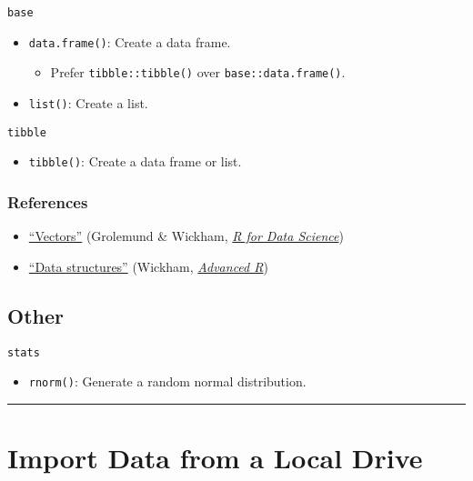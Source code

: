 \documentclass[]{book}
\providecommand{\tightlist}{%
  \setlength{\itemsep}{0pt}\setlength{\parskip}{0pt}}
\theoremstyle{definition}
\theoremstyle{definition}
\theoremstyle{definition}
\theoremstyle{remark}
\begin{document}
\texttt{base}

\begin{itemize}
\tightlist
\item
  \texttt{data.frame()}: Create a data frame.

  \begin{itemize}
  \tightlist
  \item
    Prefer \texttt{tibble::tibble()} over \texttt{base::data.frame()}.
  \end{itemize}
\item
  \texttt{list()}: Create a list.
\end{itemize}

\texttt{tibble}

\begin{itemize}
\tightlist
\item
  \texttt{tibble()}: Create a data frame or list.
\end{itemize}

\subsubsection{References}\label{references}

\begin{itemize}
\tightlist
\item
  \href{https://r4ds.had.co.nz/vectors.html}{``Vectors''} (Grolemund \&
  Wickham, \href{https://r4ds.had.co.nz/}{\emph{R for Data Science}})
\item
  \href{http://adv-r.had.co.nz/Data-structures.html}{``Data
  structures''} (Wickham, \href{http://adv-r.had.co.nz/}{\emph{Advanced
  R}})
\end{itemize}

\subsection{Other}\label{other}

\texttt{stats}

\begin{itemize}
\tightlist
\item
  \texttt{rnorm()}: Generate a random normal distribution.
\end{itemize}

\begin{center}\rule{0.5\linewidth}{\linethickness}\end{center}

\section{Import Data from a Local
Drive}\label{import-data-from-a-local-drive}
\end{document}
